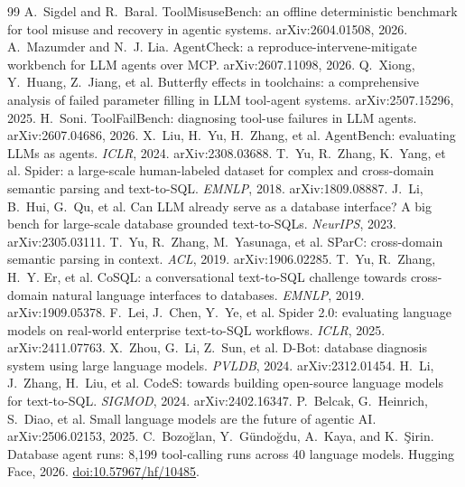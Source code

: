\documentclass[11pt]{article}
\begin{document}
\begin{thebibliography}{99}
 A.~Sigdel and R.~Baral.
\newblock ToolMisuseBench: an offline deterministic benchmark for tool misuse and recovery in agentic systems. arXiv:2604.01508, 2026.
 A.~Mazumder and N.~J. Lia.
\newblock AgentCheck: a reproduce-intervene-mitigate workbench for LLM agents over MCP. arXiv:2607.11098, 2026.
 Q.~Xiong, Y.~Huang, Z.~Jiang, et al.
\newblock Butterfly effects in toolchains: a comprehensive analysis of failed parameter filling in LLM tool-agent systems. arXiv:2507.15296, 2025.
 H.~Soni.
\newblock ToolFailBench: diagnosing tool-use failures in LLM agents. arXiv:2607.04686, 2026.
 X.~Liu, H.~Yu, H.~Zhang, et al.
\newblock AgentBench: evaluating LLMs as agents. \emph{ICLR}, 2024. arXiv:2308.03688.
 T.~Yu, R.~Zhang, K.~Yang, et al.
\newblock Spider: a large-scale human-labeled dataset for complex and cross-domain semantic parsing and text-to-SQL. \emph{EMNLP}, 2018. arXiv:1809.08887.
 J.~Li, B.~Hui, G.~Qu, et al.
\newblock Can LLM already serve as a database interface? A big bench for large-scale database grounded text-to-SQLs. \emph{NeurIPS}, 2023. arXiv:2305.03111.
 T.~Yu, R.~Zhang, M.~Yasunaga, et al.
\newblock SParC: cross-domain semantic parsing in context. \emph{ACL}, 2019. arXiv:1906.02285.
 T.~Yu, R.~Zhang, H.~Y. Er, et al.
\newblock CoSQL: a conversational text-to-SQL challenge towards cross-domain natural language interfaces to databases. \emph{EMNLP}, 2019. arXiv:1909.05378.
 F.~Lei, J.~Chen, Y.~Ye, et al.
\newblock Spider 2.0: evaluating language models on real-world enterprise text-to-SQL workflows. \emph{ICLR}, 2025. arXiv:2411.07763.
 X.~Zhou, G.~Li, Z.~Sun, et al.
\newblock D-Bot: database diagnosis system using large language models. \emph{PVLDB}, 2024. arXiv:2312.01454.
 H.~Li, J.~Zhang, H.~Liu, et al.
\newblock CodeS: towards building open-source language models for text-to-SQL. \emph{SIGMOD}, 2024. arXiv:2402.16347.
 P.~Belcak, G.~Heinrich, S.~Diao, et al.
\newblock Small language models are the future of agentic AI. arXiv:2506.02153, 2025.
 C.~Bozo\u{g}lan, Y.~G\"{u}ndo\u{g}du, A.~Kaya, and K.~\c{S}irin.
\newblock Database agent runs: 8{,}199 tool-calling runs across 40 language models.
\newblock Hugging Face, 2026. \href{https://doi.org/10.57967/hf/10485}{doi:10.57967/hf/10485}.

\end{thebibliography}
\end{document}
